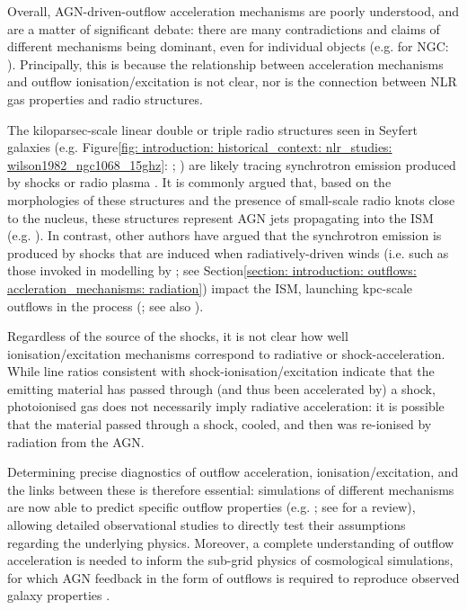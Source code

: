 Overall, AGN-driven-outflow acceleration mechanisms are poorly understood, and are a matter of significant debate: there are many contradictions and claims of different mechanisms being dominant, even for individual objects (e.g. for NGC: \citealt{Axon1998, Crenshaw2000_N1068, Das2005, Fischer2017, May2017,  Revalski2021, Meena2023}). Principally, this is because the relationship between acceleration mechanisms and outflow ionisation/excitation is not clear, nor is the connection between NLR gas properties and radio structures.

The kiloparsec-scale linear double or triple radio structures seen in Seyfert galaxies (e.g. Figure\;\ref{fig: introduction: historical_context: nlr_studies: wilson1982_ngc1068_15ghz}: \citealt{Wilson1982}; \citealt{Wilson1980, Pedlar1983, Pedlar1984, Ulvestad1984}) are likely tracing synchrotron emission produced by shocks or radio plasma \citep{Wilson1980, Ulvestad1984}. It is commonly argued that, based on the morphologies of these structures and the presence of small-scale radio knots close to the nucleus, these structures represent AGN jets propagating into the ISM (e.g. \citealt{Wilson1982, Stanghellini2005, Rosario2010b, Riffel2013b, Jarvis2019, Williams2017, Girdhar2022}). In contrast, other authors have argued that the synchrotron emission is produced by shocks that are induced when radiatively-driven winds (i.e. such as those invoked in modelling by \citealt{Hopkins2010}; see Section\;\ref{section: introduction: outflows: accleration_mechanisms: radiation}) impact the ISM, launching kpc-scale outflows in the process (\citealt{Fischer2019}; see also \citealt{Fischer2023}).

Regardless of the source of the shocks, it is not clear how well ionisation/excitation mechanisms correspond to radiative or shock-acceleration. While line ratios consistent with shock-ionisation/excitation indicate that the emitting material has passed through (and thus been accelerated by) a shock, photoionised gas does not necessarily imply radiative acceleration: it is possible that the material passed through a shock, cooled, and then was re-ionised by radiation from the AGN. 

Determining precise diagnostics of outflow acceleration, ionisation/excitation, and the links between these is therefore essential: simulations of different mechanisms are now able to predict specific outflow properties (e.g. \citealt{Richings2021, Meenakshi2022a, Meenakshi2022b}; see \citealt{Krause2023} for a review), allowing detailed observational studies to directly test their assumptions regarding the underlying physics. Moreover, a complete understanding of outflow acceleration is needed to inform the sub-grid physics of cosmological simulations, for which AGN feedback in the form of outflows is required to reproduce observed galaxy properties \citep{Schaye2015, Dubois2016, Dave2019, Zinger2020}.

